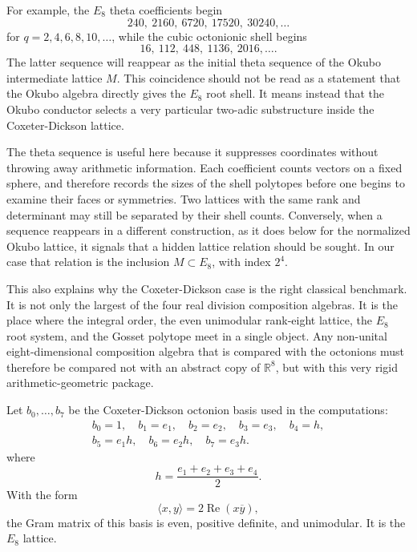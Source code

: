 \documentclass{birkjour}
\newcommand{\RR}{\mathbb R}
\numberwithin{equation}{section}
\begin{document}
For example, the \(E_8\) theta coefficients begin
\begin{equation}
240,\ 2160,\ 6720,\ 17520,\ 30240,\ldots
\end{equation}
for \(q=2,4,6,8,10,\ldots\), while the cubic octonionic shell begins
\begin{equation}
16,\ 112,\ 448,\ 1136,\ 2016,\ldots .
\end{equation}
The latter sequence will reappear as the initial theta sequence of the Okubo
intermediate lattice \(M\). This coincidence should not be read as a statement
that the Okubo algebra directly gives the \(E_8\) root shell. It means instead
that the Okubo conductor selects a very particular two-adic substructure inside
the Coxeter-Dickson lattice.

The theta sequence is useful here because it suppresses coordinates without
throwing away arithmetic information. Each coefficient counts vectors on a
fixed sphere, and therefore records the sizes of the shell polytopes before
one begins to examine their faces or symmetries. Two lattices with the same
rank and determinant may still be separated by their shell counts. Conversely,
when a sequence reappears in a different construction, as it does below for
the normalized Okubo lattice, it signals that a hidden lattice relation should
be sought. In our case that relation is the inclusion \(M\subset E_8\), with
index \(2^4\).

This also explains why the Coxeter-Dickson case is the right classical
benchmark. It is not only the largest of the four real division composition
algebras. It is the place where the integral order, the even unimodular
rank-eight lattice, the \(E_8\) root system, and the Gosset polytope meet in a
single object. Any non-unital eight-dimensional composition algebra that is
compared with the octonions must therefore be compared not with an abstract
copy of \(\RR^8\), but with this very rigid arithmetic-geometric package.

Let \(b_0,\ldots,b_7\) be the Coxeter-Dickson octonion basis used in the
computations:
\begin{equation}
\begin{split}
b_0=1,\quad b_1=e_1,\quad b_2=e_2,\quad b_3=e_3,\quad
b_4=h,\\
b_5=e_1h,\quad b_6=e_2h,\quad b_7=e_3h.
\end{split}
\end{equation}
where
\begin{equation}
h=\frac{e_1+e_2+e_3+e_4}{2}.
\end{equation}
With the form
\begin{equation}
\langle x,y\rangle=2\operatorname{Re}(x\overline y),
\end{equation}
the Gram matrix of this basis is even, positive definite, and unimodular. It
is the \(E_8\) lattice.
\end{document}
